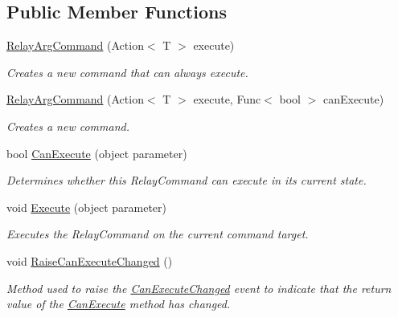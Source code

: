 \subsection*{Public Member Functions}
\begin{DoxyCompactItemize}
\item 
\hyperlink{class_eventmaker_1_1_common_1_1_relay_arg_command_aa682e7977fd6e3db0d316457e1b5651c}{Relay\+Arg\+Command} (Action$<$ T $>$ execute)
\begin{DoxyCompactList}\small\item\em Creates a new command that can always execute. \end{DoxyCompactList}\item 
\hyperlink{class_eventmaker_1_1_common_1_1_relay_arg_command_a3ab8603b5d02b7170634b02473f11c32}{Relay\+Arg\+Command} (Action$<$ T $>$ execute, Func$<$ bool $>$ can\+Execute)
\begin{DoxyCompactList}\small\item\em Creates a new command. \end{DoxyCompactList}\item 
bool \hyperlink{class_eventmaker_1_1_common_1_1_relay_arg_command_a8fe6cf8d3fdad14b8a57d751f137993e}{Can\+Execute} (object parameter)
\begin{DoxyCompactList}\small\item\em Determines whether this Relay\+Command can execute in its current state. \end{DoxyCompactList}\item 
void \hyperlink{class_eventmaker_1_1_common_1_1_relay_arg_command_a2c71f4428abecd55444f4877d5082111}{Execute} (object parameter)
\begin{DoxyCompactList}\small\item\em Executes the Relay\+Command on the current command target. \end{DoxyCompactList}\item 
void \hyperlink{class_eventmaker_1_1_common_1_1_relay_arg_command_ac3d91431f1eae86b1be1a3cb11db8ec6}{Raise\+Can\+Execute\+Changed} ()
\begin{DoxyCompactList}\small\item\em Method used to raise the \hyperlink{class_eventmaker_1_1_common_1_1_relay_arg_command_a1f0e84b52325f50a02c9fe63ca5ee7ae}{Can\+Execute\+Changed} event to indicate that the return value of the \hyperlink{class_eventmaker_1_1_common_1_1_relay_arg_command_a8fe6cf8d3fdad14b8a57d751f137993e}{Can\+Execute} method has changed. \end{DoxyCompactList}\end{DoxyCompactItemize}
